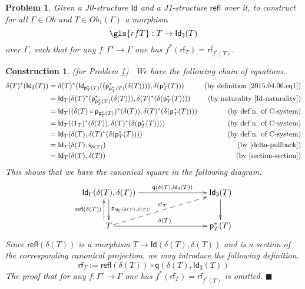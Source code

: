 \documentclass[12pt]{article}
\numberwithin{equation}{section}
\newenvironment{eq}{\begin{equation}}{\end{equation}}
\newtheorem{problem}[proposition]{Problem}
\newtheorem{construction0}[proposition]{Construction}
\newenvironment{construction}[1]{\begin{construction0}(for Problem \ref{#1})\ }{$\blacksquare$ \end{construction0}}
\newcommand{\by}[1]{\text{(by #1)}}
\newcommand{\sr}{\rightarrow}
\newcommand{\p}{\mathsf{p}}
\newcommand{\q}{\mathsf{q}}
\newcommand{\s}{\mathsf{s}}     %
\newcommand{\Id}{\mathsf{Id}} %
\newcommand{\Idx}{\mathsf{Id_3}} %
\newcommand{\refl}{\mathsf{refl}}
\newcommand{\rf}{\mathsf{rf}}
\begin{document}
\begin{problem}
\label{2015.03.27.prob2} Given a J0-structure $\Id$ and a J1-structure $\refl$
over it, to construct for all $\Gamma\in Ob$ and $T\in Ob_1(\Gamma)$ a morphism
%
$$\gls{rfT} : T \sr \Idx(T)$$
%
over $\Gamma$,
such that for any $f:\Gamma'\sr \Gamma$ one has $f^*(\rf_T)=\rf_{f^*(T)}$.
\end{problem}
%
\begin{construction}{2015.03.27.prob2}
\label{2015.03.27.constr2}\rm We have the following chain of equations.
%
\begin{align*}
  \delta(T)^*(\Idx(T)) & = \delta(T)^*(\Id_{\p_T^*(T)}((\p_{\p_T^*(T)}^*(\delta(T)))),\delta(\p_T^*(T)))
  & \by{definition \ref{2015.04.06.eq1}} \\
  & = \Id_T(\delta(T)^*(\p_{\p_T^*(T)}^*(\delta(T))),\delta(T)^*(\delta(\p_T^*(T))))
  & \by{naturality \ref{Id-naturality}} \\
  & = \Id_T((\delta(T) \circ \p_{\p_T^*(T)})^*(\delta(T)),\delta(T)^*(\delta(\p_T^*(T))))
  & \by{def'n{.} of C-system} \\
  & = \Id_T((1_T)^*(\delta(T)),\delta(T)^*(\delta(\p_T^*(T)))) 
  & \by{def'n{.} of C-system} \\
  & = \Id_T(\delta(T),\delta(T)^*(\delta(\p_T^*(T)))) 
  & \by{def'n{.} of C-system} \\
  & = \Id_T(\delta(T),\s_{\delta(T)})
  & \by{\ref{delta-pullback}}  \\
  & = \Id_T(\delta(T),\delta(T))
  & \by{\ref{section-section}} 
\end{align*}
%
This shows that we have the canonical square in the following diagram.
%
\begin{eq}
\label{2015.03.31.eq3}
\begin{xy}
          \xymatrix@C=7pc{ \Id_\Gamma(\delta(T),\delta(T))
            \ar[r]^-{\q(\delta(T),\Idx(T))} \ar[d]^{\p_{\Id_\Gamma(\delta(T),\delta(T))}} & \Idx(T) \ar[d]\\ T
            \ar[r]^{\delta(T)} \ar@<6pt>[u]^{\refl(\delta(T))} \ar@{-->}[ru]^{\rf_T}
            & \p_T^*(T) }
       \end{xy}
\end{eq}%
%
Since $\refl(\delta(T))$ is a morphism $T\sr \Id(\delta(T),\delta(T))$
and is a section of the corresponding canonical projection,
we may introduce the following definition.
%
\begin{eq}
\label{2015.04.02.eq1} \rf_T:=\refl(\delta(T))\circ \q(\delta(T),\Idx(T))
\end{eq}%
%
The proof that for any $f:\Gamma'\sr \Gamma$ one has $f^*(\rf_T)=\rf_{f^*(T)}$ is
omitted.
\end{construction}
\end{document}
